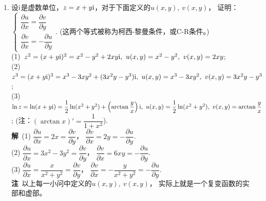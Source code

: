 \begin{enumerate}[label={【\textbf{例\thechapter.\arabic*}】},
 leftmargin=\inteval{\myenumleftmargin}pt,
 itemsep=\inteval{\myenumitempsep}pt,
 itemindent=\inteval{\myenumitemindent}pt]
\item 设$ \mathrm{i} $是虚数单位，$ z=x+y\mathrm{i} $，对于下面定义的$ u(x,y),\ v(x,y) $，
证明：$ \begin{cases}
    \dfrac{\partial u}{\partial x} =\dfrac{\partial v}{\partial y} \\
    \dfrac{\partial v}{\partial x} =-\dfrac{\partial u}{\partial y} 
\end{cases} $. (这两个等式被称为柯西-黎曼条件，或C-R条件。)\\
(1)\ $ z^2=(x+y\i)^2=x^2-y^2+2xy\i,\ u(x,y)=x^2-y^2,\ v(x,y)=2xy $; \\
(2)\ $ z^3=(x+y\i)^3=x^3-3xy^2+(3x^2y-y^3)\i,\ u(x,y)=x^3-3xy^2,\ 
v(x,y)=3x^2y-y^3 $; \\
(3)\ $ \ln z=\ln(x+y\mathrm{i})=\dfrac{1}{2}\ln(x^2+y^2)+\left(\arctan\dfrac{y}{x}\right)\mathrm{i},
\ u(x,y)=\dfrac{1}{2}\ln(x^2+y^2),\ v(x,y)=\arctan\dfrac{y}{x} $; 
(注：$ (\arctan x)'=\dfrac{1}{1+x^2} $). \\
\textbf{解}\ (1) $ \dfrac{\partial u}{\partial x} =2x=
\dfrac{\partial v}{\partial y} $，
$ \dfrac{\partial v}{\partial x} =2y=
-\dfrac{\partial u}{\partial y} $. \\
(2) $ \dfrac{\partial u}{\partial x} =3x^2-3y^2=
\dfrac{\partial v}{\partial y} $，
$ \dfrac{\partial v}{\partial x} =6xy=
-\dfrac{\partial u}{\partial y} $. \\
(3) $ \dfrac{\partial u}{\partial x} =\dfrac{x}{x^2+y^2}=
\dfrac{\partial v}{\partial y} $，
$ \dfrac{\partial v}{\partial x} = -\dfrac{y}{x^2+y^2}=
-\dfrac{\partial u}{\partial y} $. \\
\textbf{注}\ 以上每一小问中定义的$ u(x,y),\ v(x,y) $，
实际上就是一个复变函数的实部和虚部。


\end{enumerate}
